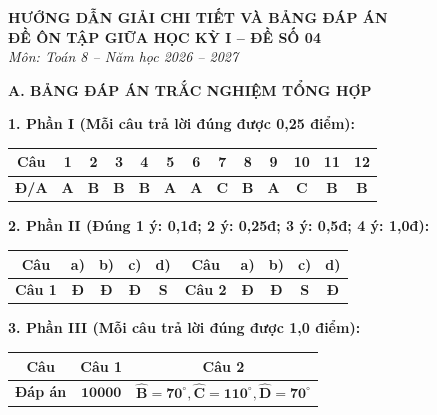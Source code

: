 \documentclass[12pt,a4paper]{article}
\begin{document}
\begin{center}
  \textbf{\Large HƯỚNG DẪN GIẢI CHI TIẾT VÀ BẢNG ĐÁP ÁN}\\
  \textbf{\large ĐỀ ÔN TẬP GIỮA HỌC KỲ I -- ĐỀ SỐ 04}\\
  \textit{Môn: Toán 8 -- Năm học 2026 -- 2027}
\end{center}
\vspace{2mm}

\noindent\textbf{\large A. BẢNG ĐÁP ÁN TRẮC NGHIỆM TỔNG HỢP}
\vspace{1mm}

\noindent\textbf{1. Phần I (Mỗi câu trả lời đúng được 0,25 điểm):}
\begin{center}
\begin{tabular}{|c|c|c|c|c|c|c|c|c|c|c|c|c|}
\hline
\textbf{Câu} & \textbf{1} & \textbf{2} & \textbf{3} & \textbf{4} & \textbf{5} & \textbf{6} & \textbf{7} & \textbf{8} & \textbf{9} & \textbf{10} & \textbf{11} & \textbf{12} \\
\hline
\textbf{Đ/A} & \textbf{A} & \textbf{B} & \textbf{B} & \textbf{B} & \textbf{A} & \textbf{A} & \textbf{C} & \textbf{B} & \textbf{A} & \textbf{C} & \textbf{B} & \textbf{B} \\
\hline
\end{tabular}
\end{center}
\vspace{0.5mm}

\noindent\textbf{2. Phần II (Đúng 1 ý: 0,1đ; 2 ý: 0,25đ; 3 ý: 0,5đ; 4 ý: 1,0đ):}
\begin{center}
\begin{tabular}{|c|c|c|c|c||c|c|c|c|c|}
\hline
\textbf{Câu} & \textbf{a)} & \textbf{b)} & \textbf{c)} & \textbf{d)} & \textbf{Câu} & \textbf{a)} & \textbf{b)} & \textbf{c)} & \textbf{d)} \\
\hline
\textbf{Câu 1} & \textbf{Đ} & \textbf{Đ} & \textbf{Đ} & \textbf{S} & \textbf{Câu 2} & \textbf{Đ} & \textbf{Đ} & \textbf{S} & \textbf{Đ} \\
\hline
\end{tabular}
\end{center}
\vspace{0.5mm}

\noindent\textbf{3. Phần III (Mỗi câu trả lời đúng được 1,0 điểm):}
\begin{center}
\begin{tabular}{|c|c|c|}
\hline
\textbf{Câu} & \textbf{Câu 1} & \textbf{Câu 2} \\
\hline
\textbf{Đáp án} & $\mathbf{10000}$ & $\mathbf{\widehat{B} = 70^\circ, \widehat{C} = 110^\circ, \widehat{D} = 70^\circ}$ \\
\hline
\end{tabular}
\end{center}
\vspace{1.5mm}
\end{document}

